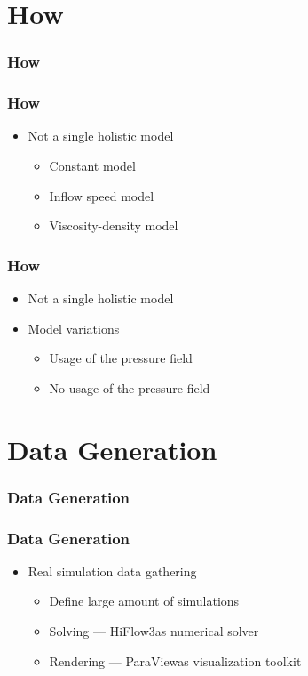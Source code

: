 \documentclass[18pt, xcolor=table]{beamer}
\begin{document}
\section{How}

\begin{frame}[t]
  \frametitle{How}
\end{frame}

\begin{frame}[t]
  \frametitle{How}
  \begin{itemize}
  \item Not a single holistic model
  \begin{itemize}
    \item Constant model
    \item Inflow speed model
    \item Viscosity-density model
    \end{itemize}
  \end{itemize}
\end{frame}

\begin{frame}[t]
  \frametitle{How}
  \begin{itemize}
  \item Not a single holistic model
  \item Model variations
    \begin{itemize}
    \item Usage of the pressure field
    \item No usage of the pressure field
    \end{itemize}
  \end{itemize}
\end{frame}

\section{Data Generation}

\begin{frame}[t]
  \frametitle{Data Generation}
\end{frame}

\begin{frame}[t]
  \frametitle{Data Generation}
  \begin{itemize}
  \item Real simulation data gathering
    \begin{itemize}
    \item Define large amount of simulations
    \item Solving --- HiFlow3\footnotemark as numerical solver
    \item Rendering --- ParaView\footnotemark as visualization toolkit
    \end{itemize}
  \end{itemize}
\end{frame}
\end{document}
